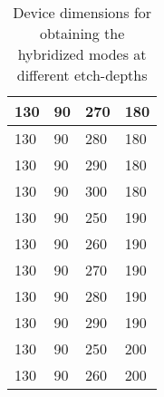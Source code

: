 \documentclass[../report.tex]{subfiles}
\begin{document}
\begin {table}[H]
\begin{center}
\begin{tabular}{ | m{6em} | m{6em}| m{6em} | m{6em} | }
		\hline
		130 & 90 & 270 & 180 \\ 
		\hline
		130 & 90 & 280 & 180 \\ 
		\hline
		130 & 90 & 290 & 180 \\ 
		\hline
		130 & 90 & 300 & 180 \\ 
		\hline
		130 & 90 & 250 & 190 \\ 
		\hline
		130 & 90 & 260 & 190 \\ 
		\hline
		130 & 90 & 270 & 190 \\ 
		\hline
		130 & 90 & 280 & 190 \\ 
		\hline
		130 & 90 & 290 & 190 \\ 
		\hline
		130 & 90 & 250 & 200 \\ 
		\hline
		130 & 90 & 260 & 200 \\ 
		\hline
	\end{tabular}
\end{center}
\caption {Device dimensions for obtaining the hybridized modes at different etch-depths} \label{table:device_tolerance} 
\end {table}
\end{document}
